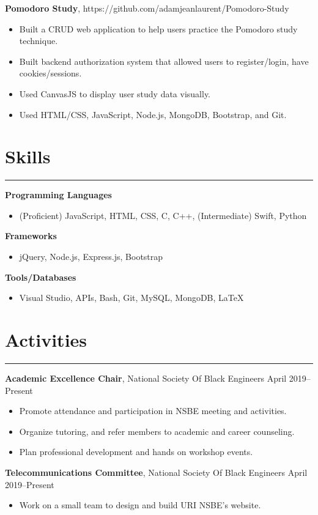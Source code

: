 \documentclass[11pt]{article}
\newcommand{\resumesection}[1]{\vspace{-0.2cm}\section*{#1}\vspace{-0.2cm}\hrule\vspace{0.2cm}}
\begin{document}
\textbf{Pomodoro Study}, https://github.com/adamjeanlaurent/Pomodoro-Study
\begin{itemize}
	\item Built a CRUD web application to help users practice the Pomodoro study technique.
	\item  Built backend authorization system that allowed users to register/login, have cookies/sessions.
	\item Used CanvasJS to display user study data visually.
	\item Used HTML/CSS, JavaScript, Node.js, MongoDB, Bootstrap, and Git.
\end{itemize}

\resumesection{Skills}

\textbf{Programming Languages}
\begin{itemize}
	\item (Proficient) JavaScript, HTML, CSS, C, C++, (Intermediate) Swift, Python 
\end{itemize}

\textbf{Frameworks}
\begin{itemize}
	\item jQuery, Node.js, Express.js, Bootstrap
\end{itemize}

\textbf{Tools/Databases}
\begin{itemize}
	\item Visual Studio, APIs, Bash, Git, MySQL, MongoDB, \LaTeX
\end{itemize}

\resumesection{Activities}

\textbf{Academic Excellence Chair}, National Society Of Black Engineers \hfill April 2019--Present
\begin{itemize}
	\item Promote attendance and participation in NSBE meeting and activities.
	\item Organize tutoring, and refer members to academic and career counseling.
	\item Plan professional development and hands on workshop events.
\end{itemize}

\textbf{Telecommunications Committee}, National Society Of Black Engineers \hfill April 2019--Present
\begin{itemize}
	\item Work on a small team to design and build URI NSBE's website.
\end{itemize}
\end{document}
